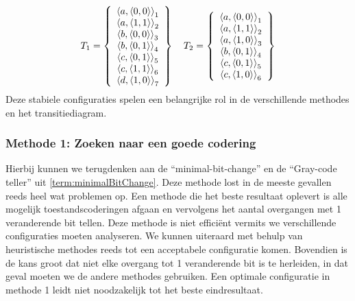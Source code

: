 \begin{equation}
T_1=\acclarray{
\tupl{a,\tupl{0,0}}_1\\
\tupl{a,\tupl{1,1}}_2\\
\tupl{b,\tupl{0,0}}_3\\
\tupl{b,\tupl{0,1}}_4\\
\tupl{c,\tupl{0,1}}_5\\
\tupl{c,\tupl{1,1}}_6\\
\tupl{d,\tupl{1,0}}_7
}\ \ \ 
T_2=\acclarray{
\tupl{a,\tupl{0,0}}_1\\
\tupl{a,\tupl{1,1}}_2\\
\tupl{a,\tupl{1,0}}_3\\
\tupl{b,\tupl{0,1}}_4\\
\tupl{c,\tupl{0,1}}_5\\
\tupl{c,\tupl{1,0}}_6
}
\end{equation}
Deze stabiele configuraties spelen een belangrijke rol in de verschillende methodes en het transitiediagram.
\subsubsection{Methode 1: Zoeken naar een goede codering}
Hierbij kunnen we terugdenken aan de ``minimal-bit-change'' en de ``Gray-code teller'' uit \ref{term:minimalBitChange}. Deze methode lost in de meeste gevallen reeds heel wat problemen op. Een methode die het beste resultaat oplevert is alle mogelijk toestandscoderingen afgaan en vervolgens het aantal overgangen met 1 veranderende bit tellen. Deze methode is niet effici\"ent vermits we  verschillende configuraties moeten analyseren. We kunnen uiteraard met behulp van heuristische methodes reeds tot een acceptabele configuratie komen. Bovendien is de kans groot dat niet elke overgang tot 1 veranderende bit is te herleiden, in dat geval moeten we de andere methodes gebruiken. Een optimale configuratie in methode 1 leidt niet noodzakelijk tot het beste eindresultaat.

